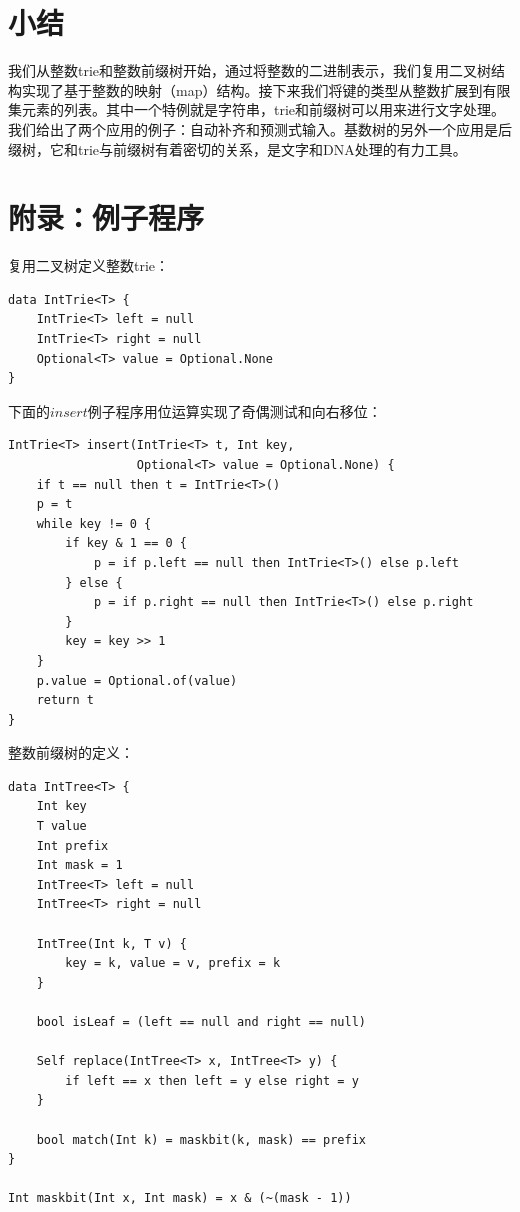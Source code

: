 \documentclass[b5paper]{ctexart}
\begin{document}
\section{小结}
我们从整数trie和整数前缀树开始，通过将整数的二进制表示，我们复用二叉树结构实现了基于整数的映射（map）结构。接下来我们将键的类型从整数扩展到有限集元素的列表。其中一个特例就是字符串，trie和前缀树可以用来进行文字处理。我们给出了两个应用的例子：自动补齐和预测式输入。基数树的另外一个应用是后缀树，它和trie与前缀树有着密切的关系，是文字和DNA处理的有力工具。

\section{附录：例子程序}

复用二叉树定义整数trie：

\begin{lstlisting}[language = Bourbaki]
data IntTrie<T> {
    IntTrie<T> left = null
    IntTrie<T> right = null
    Optional<T> value = Optional.None
}
\end{lstlisting}

下面的$insert$例子程序用位运算实现了奇偶测试和向右移位：

\begin{lstlisting}[language = Bourbaki]
IntTrie<T> insert(IntTrie<T> t, Int key,
                  Optional<T> value = Optional.None) {
    if t == null then t = IntTrie<T>()
    p = t
    while key != 0 {
        if key & 1 == 0 {
            p = if p.left == null then IntTrie<T>() else p.left
        } else {
            p = if p.right == null then IntTrie<T>() else p.right
        }
        key = key >> 1
    }
    p.value = Optional.of(value)
    return t
}
\end{lstlisting}



整数前缀树的定义：

\begin{lstlisting}[language = Bourbaki]
data IntTree<T> {
    Int key
    T value
    Int prefix
    Int mask = 1
    IntTree<T> left = null
    IntTree<T> right = null

    IntTree(Int k, T v) {
        key = k, value = v, prefix = k
    }

    bool isLeaf = (left == null and right == null)

    Self replace(IntTree<T> x, IntTree<T> y) {
        if left == x then left = y else right = y
    }

    bool match(Int k) = maskbit(k, mask) == prefix
}

Int maskbit(Int x, Int mask) = x & (~(mask - 1))
\end{lstlisting}
\end{document}
